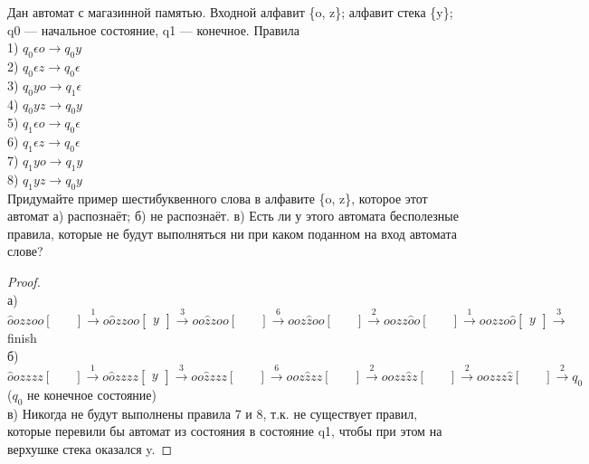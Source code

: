 \begin{problem}
Дан автомат с магазинной памятью. Входной алфавит
\{o, z\}; алфавит стека \{y\}; q0 — начальное состояние, q1 — конечное.
Правила\\
1) $q_0\epsilon o \to q_0y$\\
2) $q_0\epsilon z \to q_0\epsilon$\\
3) $q_0 yo \to q_1 \epsilon$\\
4) $q_0yz \to q_0 y$\\
5) $q_1\epsilon o \to q_0\epsilon$\\
6) $q_1\epsilon z \to q_0\epsilon$\\
7) $q_1 yo \to q_1y$\\
8) $q_1 yz \to q_0 y$\\
Придумайте пример шестибуквенного слова в алфавите
\{o, z\}, которое этот автомат а) распознаёт; б) не распознаёт.
в) Есть ли у этого автомата бесполезные правила, которые
не будут выполняться ни при каком поданном на вход автомата слове?
\end{problem}
\begin{proof} $ $\\
а) 
$
\hat{o}ozzoo
\begin{bmatrix}
    \quad
\end{bmatrix}
\xrightarrow{1}
o\hat{o}zzoo
\begin{bmatrix}
    y
\end{bmatrix}
\xrightarrow{3}
oo\hat{z}zoo
\begin{bmatrix}
    \quad
\end{bmatrix}
\xrightarrow{6}
ooz\hat{z}oo
\begin{bmatrix}
    \quad
\end{bmatrix}
\xrightarrow{2}
oozz\hat{o}o
\begin{bmatrix}
    \quad
\end{bmatrix}
\xrightarrow{1}
oozzo\hat{o}
\begin{bmatrix}
    y
\end{bmatrix}
\xrightarrow{3}
$
finish\\
б) 
$
\hat{o}ozzzz
\begin{bmatrix}
    \quad
\end{bmatrix}
\xrightarrow{1}
o\hat{o}zzzz
\begin{bmatrix}
    y
\end{bmatrix}
\xrightarrow{3}
oo\hat{z}zzz
\begin{bmatrix}
    \quad
\end{bmatrix}
\xrightarrow{6}
ooz\hat{z}zz
\begin{bmatrix}
    \quad
\end{bmatrix}
\xrightarrow{2}
oozz\hat{z}z
\begin{bmatrix}
    \quad
\end{bmatrix}
\xrightarrow{2}
oozzz\hat{z}
\begin{bmatrix}
    \quad
\end{bmatrix}
\xrightarrow{2}
q_0$ ($q_0$ не конечное состояние)\\
в) Никогда не будут выполнены правила 7 и 8, т.к. не существует правил, которые перевили бы автомат из состояния в состояние q1, чтобы при этом на верхушке стека оказался y.
\end{proof}
